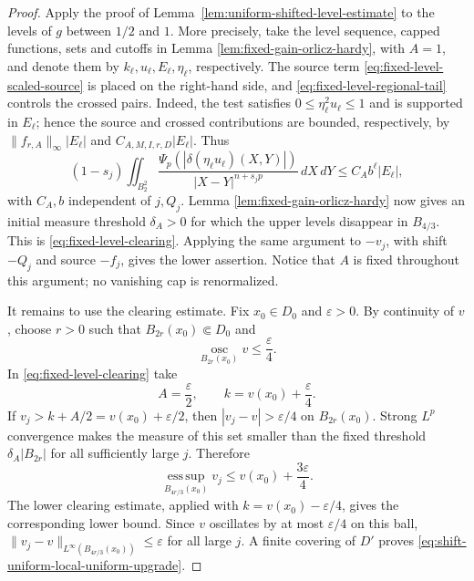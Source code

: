 \documentclass[11pt,reqno]{amsart}
\numberwithin{equation}{section}
\newcommand{\dd}{\,d}
\newcommand{\osc}{\operatorname*{osc}}
\theoremstyle{remark}
\begin{document}
\begin{proof}
Apply the proof of Lemma~\ref{lem:uniform-shifted-level-estimate} to
the levels of \(g\) between \(1/2\) and \(1\).  More precisely, take
the level sequence, capped functions, sets and cutoffs in Lemma
\ref{lem:fixed-gain-orlicz-hardy}, with \(A=1\), and denote them by
\(k_\ell,u_\ell,E_\ell,\eta_\ell\), respectively.  The source term
\eqref{eq:fixed-level-scaled-source} is placed on the right-hand side,
and \eqref{eq:fixed-level-regional-tail} controls the crossed pairs.
Indeed, the test satisfies \(0\le\eta_\ell^2u_\ell\le1\) and is
supported in \(E_\ell\); hence the source and crossed contributions are
bounded, respectively, by
\(\|f_{r,A}\|_\infty|E_\ell|\) and
\(C_{A,M,I,r,D}|E_\ell|\).
Thus
\[
 (1-s_j)\iint_{B_2^2}
 \frac{\Psi_p(|\delta(\eta_\ell u_\ell)(X,Y)|)}
 {|X-Y|^{n+s_jp}}\dd X\!\dd Y
 \le C_Ab^\ell|E_\ell|,
\]
with \(C_A,b\) independent of \(j,Q_j\).  Lemma
\ref{lem:fixed-gain-orlicz-hardy} now gives an initial measure threshold
\(\delta_A>0\) for which the upper levels disappear in \(B_{4/3}\).
This is \eqref{eq:fixed-level-clearing}.  Applying the same argument to
\(-v_j\), with shift \(-Q_j\) and source \(-f_j\), gives the lower
assertion.  Notice that \(A\) is fixed throughout this argument; no
vanishing cap is renormalized.

It remains to use the clearing estimate.  Fix \(x_0\in D_0\) and
\(\varepsilon>0\).  By continuity of \(v\), choose \(r>0\) such that
\(B_{2r}(x_0)\Subset D_0\) and
\[
 \osc_{B_{2r}(x_0)}v\le\frac{\varepsilon}{4}.
\]
In \eqref{eq:fixed-level-clearing} take
\[
 A=\frac{\varepsilon}{2},
 \qquad k=v(x_0)+\frac{\varepsilon}{4}.
\]
If \(v_j>k+A/2=v(x_0)+\varepsilon/2\), then
\(|v_j-v|>\varepsilon/4\) on \(B_{2r}(x_0)\).  Strong \(L^p\)
convergence makes the measure of this set smaller than the fixed
threshold \(\delta_A|B_{2r}|\) for all sufficiently large \(j\).
Therefore
\[
 \operatorname*{ess\,sup}_{B_{4r/3}(x_0)}v_j
 \le v(x_0)+\frac{3\varepsilon}{4}.
\]
The lower clearing estimate, applied with
\(k=v(x_0)-\varepsilon/4\), gives the corresponding lower bound.
Since \(v\) oscillates by at most \(\varepsilon/4\) on this ball,
\(\|v_j-v\|_{L^\infty(B_{4r/3}(x_0))}\le\varepsilon\) for all large
\(j\).  A finite covering of \(D'\) proves
\eqref{eq:shift-uniform-local-uniform-upgrade}.
\end{proof}
\end{document}
